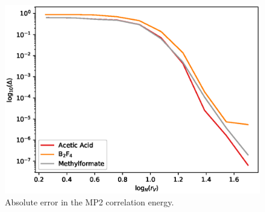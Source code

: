\begin{figure}[tb]
\includegraphics[width=\columnwidth]{figures/thc_rccsd/mp2_err_ao_full}
\caption{Absolute error in the MP2 correlation energy.
\label{fig:mp2_err_ao_full}}
\end{figure}
%
